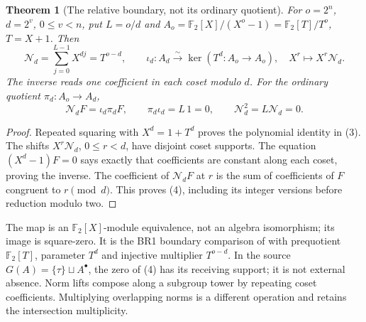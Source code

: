 \documentclass[10pt,a4paper]{article}
\newtheorem{theorem}{Theorem}
\begin{document}
\begin{theorem}[The relative boundary, not its ordinary quotient]
For $o=2^n$, $d=2^v$, $0\le v<n$, put $L=o/d$ and
$A_o=\mathbb F_2[X]/(X^o-1)=\mathbb F_2[T]/T^o$, $T=X+1$.
Then
\[
 \mathcal N_d=\sum_{j=0}^{L-1}X^{dj}=T^{o-d},\qquad
 \iota_d:A_d\xrightarrow{\sim}\ker(T^d:A_o\to A_o),\quad
 X^r\mapsto X^r\mathcal N_d.                               \tag{3}
\]
The inverse reads one coefficient in each coset modulo $d$. For the ordinary
quotient $\pi_d:A_o\to A_d$,
\[
 \mathcal N_dF=\iota_d\pi_dF,\qquad
 \pi_d\iota_d=L\,1=0,\qquad \mathcal N_d^2=L\mathcal N_d=0. \tag{4}
\]
\end{theorem}
\begin{proof}
Repeated squaring with $X^d=1+T^d$ proves the polynomial identity in (3).
The shifts $X^r\mathcal N_d$, $0\le r<d$, have disjoint coset supports.
The equation $(X^d-1)F=0$ says exactly that coefficients are constant along
each coset, proving the inverse. The coefficient of $\mathcal N_dF$ at $r$
is the sum of coefficients of $F$ congruent to $r\pmod d$. This proves (4),
including its integer versions before reduction modulo two.
\end{proof}
The map is an $\mathbb F_2[X]$-module equivalence, not an algebra isomorphism; its image is
square-zero. It is the BR1 boundary comparison of \cite{SZ} with prequotient
$\mathbb F_2[T]$, parameter $T^d$ and injective multiplier $T^{o-d}$.
In the source $G(A)=\{\tau\}\sqcup A^\bullet$, the zero of (4) has its receiving
support; it is not external absence. Norm lifts compose along a subgroup tower
by repeating coset coefficients. Multiplying overlapping norms is a different
operation and retains the intersection multiplicity.
\end{document}
